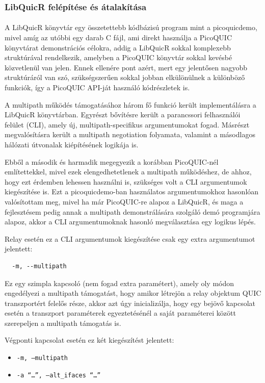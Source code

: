 \documentclass[a4paper,oneside]{article}
\begin{document}
\subsubsection{LibQuicR felépítése és átalakítása}
\paragraph{}

A LibQuicR könyvtár egy összetettebb kódbázisú program mint a picoquicdemo, mivel amíg az utóbbi egy darab C fájl, 
ami direkt használja a PicoQUIC könyvtárat demonstrációs célokra,
addig a LibQuicR sokkal komplexebb struktúrával rendelkezik, amelyben a PicoQUIC könyvtár sokkal kevésbé közvetlenül van jelen.
Ennek ellenére pont azért, mert egy jelentősen nagyobb struktúráról van szó, szükségszerűen sokkal 
jobban elkülönülnek a különböző funkciók, így a PicoQUIC API-ját használó kódrészletek is.

A multipath működés támogatásához három fő funkció került implementálásra a LibQuicR könyvtárban. 
Egyrészt bővítésre került a parancssori felhasználói felület (CLI), amely új, multipath-specifikus 
argumentumokat fogad. Másrészt megvalósításra került a multipath negotiation folyamata, valamint a 
másodlagos hálózati útvonalak kiépítésének logikája is.

Ebből a második és harmadik megegyezik a korábban PicoQUIC-nél említettekkel, mivel ezek elengedhetetlenek a multipath működéshez,
de ahhoz, hogy ezt érdemben lehessen használni is, szükséges volt a CLI argumentumok kiegészítése is.
Ezt a picoquicdemo-ban használatos argumentumokhoz hasonlóan 
valósítottam meg, mivel ha már PicoQUIC-re alapoz a LibQuicR, és maga a fejlesztésem pedig annak a 
multipath demonstrálására szolgáló demó programjára alapoz, akkor a CLI argumentumoknak hasonló megválasztása egy logikus lépés.

Relay esetén ez a CLI argumentumok kiegészítése csak egy extra argumentumot jelentett:
\begin{verbatim}
  -m, --multipath
\end{verbatim}
Ez egy szimpla kapcsoló (nem fogad extra paramétert), amely oly módon engedélyezi a multipath támogatást, 
hogy amikor létrejön a relay objektum QUIC transzportért felelős része,
akkor azt úgy inicializálja, hogy egy bejövő kapcsolat esetén a transzport paraméterek 
egyeztetésénél a saját paraméterei között szerepeljen a multipath támogatás is.

Végponti kapcsolat esetén ez két kiegészítést jelentett:
\begin{itemize}
  \item \texttt{-m, --multipath}
  \item \texttt{-a ``\ldots'', --alt\_ifaces ``\ldots''}
\end{itemize}
\end{document}
